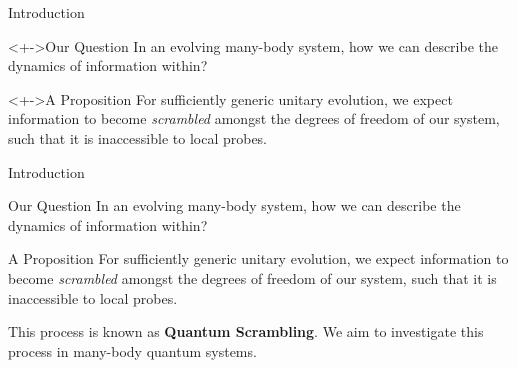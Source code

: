   
  \begin{frame}{Introduction}
    \begin{block}<+->{Our Question}
    In an evolving many-body system, how we can describe the dynamics of information within?
    \end{block}
    \begin{block}<+->{A Proposition}
      For sufficiently generic unitary evolution, we expect information to become \textit{scrambled} amongst the degrees of freedom of our system, such that it is inaccessible to local probes.
      \end{block}



  

  \end{frame}
\begin{frame}{Introduction}
  \begin{block}{Our Question}
    In an evolving many-body system, how we can describe the dynamics of information within?
  \end{block}
  \begin{block}{A Proposition}
  For sufficiently generic unitary evolution, we expect information to become \textit{scrambled} amongst the degrees of freedom of our system, such that it is inaccessible to local probes.
  \end{block}
  This process is known as \textbf{Quantum Scrambling}. We aim to investigate this process in many-body quantum systems.  

\end{frame}
